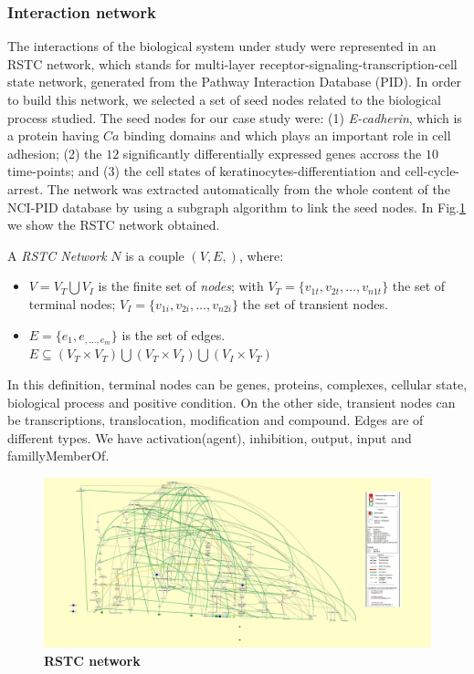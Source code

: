 \subsubsection{Interaction network}
\label{ssec:RSTC}
The interactions of the biological system under study were represented in
 an RSTC network, which stands for  multi-layer receptor-signaling-transcription-cell state network, generated from the Pathway Interaction Database (PID).
In order to build this network, we selected a set of seed nodes related to the biological process studied.
The seed nodes for our case study were:  (1) \emph{E-cadherin}, which is a protein having $Ca$ binding domains and which plays an important role in cell adhesion;
(2) the $12$ significantly differentially expressed genes accross the $10$ time-points; and (3) the cell states of keratinocytes-differentiation and cell-cycle-arrest. 
The network was extracted automatically from the whole content of the NCI-PID database by using a subgraph algorithm to link the seed nodes\cite{guziolowski2012automatic}. 
In Fig.\ref{fig:network} we show the RSTC network obtained. 

\begin{definition}\label{def:RSTCDef}
A \emph{RSTC Network} $N$ is a couple $(V,E,)$, where:
\begin{itemize}
\item $V =V_{T} \bigcup V_{I} $ is the finite set of \emph{nodes};
 with 
  $V_{T} = \{v_{1t},v_{2t}, \dots ,v_{n1t} \} $ the set of terminal nodes;
  $V_{I} = \{v_{1i},v_{2i}, \dots ,v_{n2i}\} $ the set of transient nodes.
\item $E = \{e_{1},e_{, \dots, e_{m}}  \}$ is the set of edges. $ E \subseteq (V_{T} \times V_{T}) \bigcup (V_{T} \times V_{I}) 
\bigcup (V_{I} \times V_{T})$
\end{itemize}
\end{definition}

In this definition, terminal nodes can be genes, proteins, complexes, cellular state, biological process and positive condition. 
On the other side, transient nodes can be transcriptions, translocation, modification and compound. Edges are of different types.
We have activation(agent), inhibition, output, input and famillyMemberOf.

\begin{figure}[!t]
 \centering
 \includegraphics[width=7.5in]{images/net1.jpeg}
\caption{{\bf RSTC network}} 
 \label{fig:network}
\end{figure}

